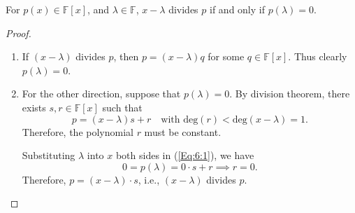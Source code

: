 \begin{theorem}
For $p(x)\in\mathbb{F}[x]$, and $\lambda\in\mathbb{F}$, $x-\lambda$ divides $p$ if and only if $p(\lambda)=0$.
\end{theorem}
\begin{proof}
\begin{enumerate}
\item
If $(x-\lambda)$ divides $p$, then $p=(x-\lambda)q$ for some $q\in\mathbb{F}[x]$. Thus clearly $p(\lambda)=0$.
\item
For the other direction, suppose that $p(\lambda)=0$. By division theorem, there exists $s,r\in\mathbb{F}[x]$ such that 
\begin{equation}\label{Eq:6:1}
p=(x-\lambda)s+r\quad \text{with deg$(r)<$deg$(x-\lambda)=1$.}
\end{equation}
Therefore, the polynomial $r$ must be  constant. 

Substituting $\lambda$ into $x$ both sides in (\ref{Eq:6:1}), we have
\[
0 = p(\lambda)=0\cdot s+r\implies r=0.
\]
Therefore, $p = (x-\lambda)\cdot s$, i.e., $(x-\lambda)$ divides $p$.
\end{enumerate}
\end{proof}













